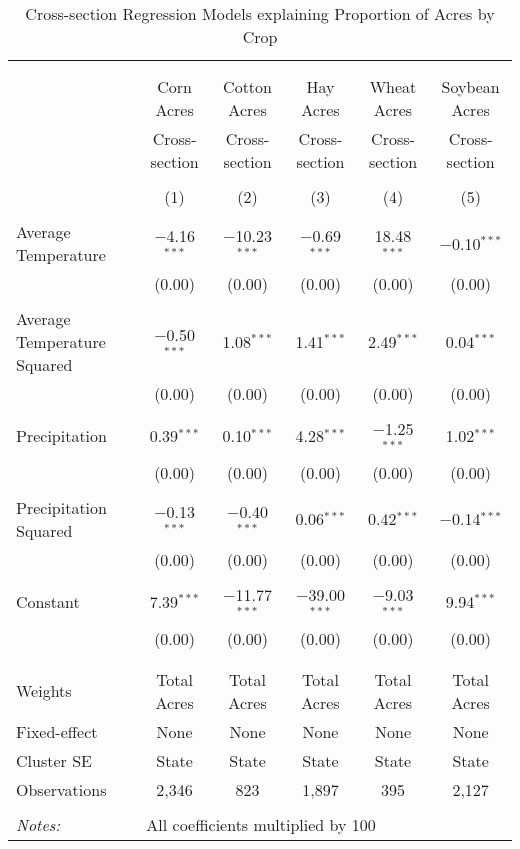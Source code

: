 \documentclass[10pt]{article}
\begin{document}
\newpage
\begin{table}[!htbp] \centering 
  \caption{Cross-section Regression Models explaining Proportion of Acres by Crop} 
  \label{} 
\footnotesize 
\begin{tabular}{@{\extracolsep{5pt}}lccccc} 
\\[-1.8ex]\hline 
\hline \\[-1.8ex] 
\\[-1.8ex] & Corn Acres & Cotton Acres & Hay Acres & Wheat Acres & Soybean Acres \\ 
 & Cross-section & Cross-section & Cross-section & Cross-section & Cross-section \\ 
\\[-1.8ex] & (1) & (2) & (3) & (4) & (5)\\ 
\hline \\[-1.8ex] 
 Average Temperature & $-$4.16$^{***}$ & $-$10.23$^{***}$ & $-$0.69$^{***}$ & 18.48$^{***}$ & $-$0.10$^{***}$ \\ 
  & (0.00) & (0.00) & (0.00) & (0.00) & (0.00) \\ 
  & & & & & \\ 
 Average Temperature Squared & $-$0.50$^{***}$ & 1.08$^{***}$ & 1.41$^{***}$ & 2.49$^{***}$ & 0.04$^{***}$ \\ 
  & (0.00) & (0.00) & (0.00) & (0.00) & (0.00) \\ 
  & & & & & \\ 
 Precipitation & 0.39$^{***}$ & 0.10$^{***}$ & 4.28$^{***}$ & $-$1.25$^{***}$ & 1.02$^{***}$ \\ 
  & (0.00) & (0.00) & (0.00) & (0.00) & (0.00) \\ 
  & & & & & \\ 
 Precipitation Squared & $-$0.13$^{***}$ & $-$0.40$^{***}$ & 0.06$^{***}$ & 0.42$^{***}$ & $-$0.14$^{***}$ \\ 
  & (0.00) & (0.00) & (0.00) & (0.00) & (0.00) \\ 
  & & & & & \\ 
 Constant & 7.39$^{***}$ & $-$11.77$^{***}$ & $-$39.00$^{***}$ & $-$9.03$^{***}$ & 9.94$^{***}$ \\ 
  & (0.00) & (0.00) & (0.00) & (0.00) & (0.00) \\ 
  & & & & & \\ 
\hline \\[-1.8ex] 
Weights & Total Acres & Total Acres & Total Acres & Total Acres & Total Acres \\ 
Fixed-effect & None & None & None & None & None \\ 
Cluster SE & State & State & State & State & State \\ 
Observations & 2,346 & 823 & 1,897 & 395 & 2,127 \\ 
\hline 
\hline \\[-1.8ex] 
\textit{Notes:} & \multicolumn{5}{l}{All coefficients multiplied by 100} \\ 
\end{tabular} 
\end{table} 
\end{document}
